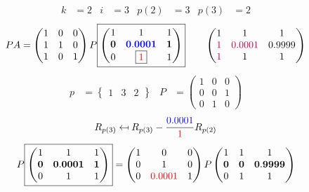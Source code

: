 \documentclass[pdf]{beamer}
\begin{document}
\begin{frame}{}\begin{align*} k &= 2 & i &= 3 & p(2) &= 3 & p(3) &= 2\end{align*} $$PA=\begin{pmatrix}1&0&0\\1&1&0\\1&0&1\end{pmatrix} P \boxed{\begin{pmatrix}1&1&1\\\mathbf{0}&\mathbf{{\color{blue}0.0001}}&\mathbf{1}\\0&\boxed{{\color{red}1}}&1\end{pmatrix}} \quad\quad \begin{pmatrix}1&1&1\\{\color{purple}1}&{\color{purple}0.0001}&0.9999\\{\color{purple}1}&1&1\end{pmatrix}$$ \begin{align*} p&= \begin{Bmatrix}1&3&2\end{Bmatrix} & P&= \begin{pmatrix}1&0&0\\0&0&1\\0&1&0\end{pmatrix} \end{align*} $$R_{p(3)} \mapsfrom R_{p(3)} - \frac{{\color{blue}0.0001}}{{\color{red}1}} R_{p(2)}$$ $$ P \boxed{\begin{pmatrix}1&1&1\\\mathbf{0}&\mathbf{0.0001}&\mathbf{1}\\0&1&1\end{pmatrix}} = \begin{pmatrix}1&0&0\\0&1&0\\0&{\color{red}0.0001}&1\end{pmatrix} P \begin{pmatrix}1&1&1\\\mathbf{0}&\mathbf{0}&\mathbf{0.9999}\\0&1&1\end{pmatrix} $$\end{frame}
\end{document}
